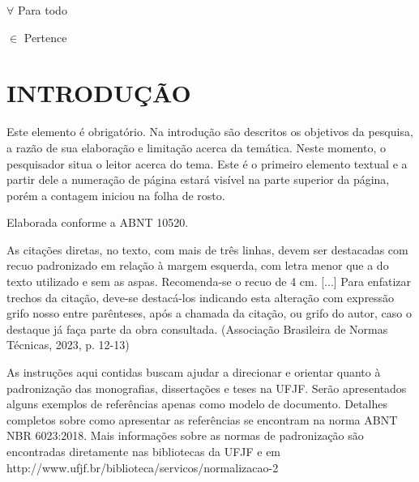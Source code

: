 \documentclass[
  oneside, %
  english,
  brazil
]{abntbibufjf}
\begin{document}
\begin{simbolos}
  \item[\( \forall \)] Para todo
  \item[\( \in \)] Pertence
\end{simbolos}



\tableofcontents*
\cleardoublepage{}



\textual{}

\chapter{INTRODUÇÃO}

Este elemento é obrigatório.
Na introdução são descritos os objetivos da pesquisa, a razão de sua elaboração e limitação acerca da temática.
Neste momento, o pesquisador situa o leitor acerca do tema.
Este é o primeiro elemento textual e a partir dele a numeração de página estará visível na parte superior da página, porém a contagem iniciou na folha de rosto.

Elaborada conforme a ABNT 10520.

\begin{citacao}
  As citações diretas, no texto, com mais de três linhas, devem ser destacadas com recuo padronizado em relação à margem esquerda, com letra menor que a do texto utilizado
  e sem as aspas.
  Recomenda-se o recuo de 4 cm. [...]
  Para enfatizar trechos da citação, deve-se destacá-los indicando esta alteração com expressão grifo nosso entre parênteses, após a chamada da citação, ou grifo do autor, caso o destaque já faça parte da obra consultada. (Associação Brasileira de Normas Técnicas, 2023, p. 12-13)
\end{citacao}

As instruções aqui contidas buscam ajudar a direcionar e orientar quanto à padronização das monografias, dissertações e teses na UFJF\@.
Serão apresentados alguns exemplos de referências apenas como modelo de documento.
Detalhes completos sobre como apresentar as referências se encontram na norma ABNT NBR 6023:2018.
Mais informações sobre as normas de padronização são encontradas diretamente nas bibliotecas da UFJF e em http://www.ufjf.br/biblioteca/servicos/normalizacao-2
\end{document}
